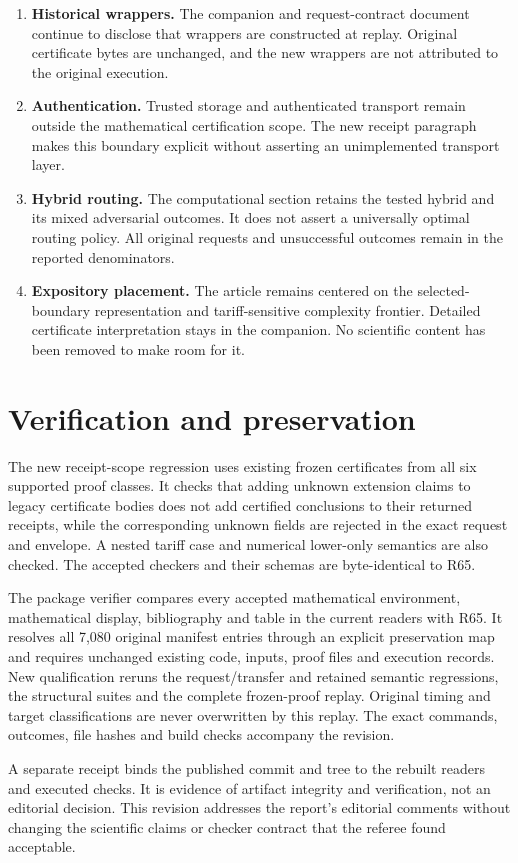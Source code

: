 \documentclass[11pt,letterpaper]{article}
\begin{document}
\begin{enumerate}[leftmargin=*,label=\textbf{\arabic*.}]
\item \textbf{Historical wrappers.} The companion and request-contract document continue to disclose that wrappers are constructed at replay. Original certificate bytes are unchanged, and the new wrappers are not attributed to the original execution.
\item \textbf{Authentication.} Trusted storage and authenticated transport remain outside the mathematical certification scope. The new receipt paragraph makes this boundary explicit without asserting an unimplemented transport layer.
\item \textbf{Hybrid routing.} The computational section retains the tested hybrid and its mixed adversarial outcomes. It does not assert a universally optimal routing policy. All original requests and unsuccessful outcomes remain in the reported denominators.
\item \textbf{Expository placement.} The article remains centered on the selected-boundary representation and tariff-sensitive complexity frontier. Detailed certificate interpretation stays in the companion. No scientific content has been removed to make room for it.
\end{enumerate}

\section*{Verification and preservation}
The new receipt-scope regression uses existing frozen certificates from all six supported proof classes. It checks that adding unknown extension claims to legacy certificate bodies does not add certified conclusions to their returned receipts, while the corresponding unknown fields are rejected in the exact request and envelope. A nested tariff case and numerical lower-only semantics are also checked. The accepted checkers and their schemas are byte-identical to R65.

The package verifier compares every accepted mathematical environment, mathematical display, bibliography and table in the current readers with R65. It resolves all 7,080 original manifest entries through an explicit preservation map and requires unchanged existing code, inputs, proof files and execution records. New qualification reruns the request/transfer and retained semantic regressions, the structural suites and the complete frozen-proof replay. Original timing and target classifications are never overwritten by this replay. The exact commands, outcomes, file hashes and build checks accompany the revision.

A separate receipt binds the published commit and tree to the rebuilt readers and executed checks. It is evidence of artifact integrity and verification, not an editorial decision. This revision addresses the report's editorial comments without changing the scientific claims or checker contract that the referee found acceptable.
\end{document}
